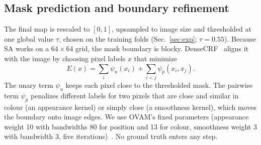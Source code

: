 \subsection{Mask prediction and boundary refinement}
\label{sec:method_crf}
The final map is rescaled to $[0,1]$, upsampled to image size and thresholded at one global value $\tau$, chosen on the training folds (Sec.~\ref{sec:exp}; $\tau{=}0.55$). Because SA works on a $64\times64$ grid, the mask boundary is blocky. DenseCRF~\cite{krahenbuhl2011crf} aligns it with the image by choosing pixel labels $x$ that minimize
\begin{equation}
E(x)=\sum_i\psi_u(x_i)+\sum_{i<j}\psi_p(x_i,x_j).
\label{eq:crf}
\end{equation}
The unary term $\psi_u$ keeps each pixel close to the thresholded mask. The pairwise term $\psi_p$ penalizes different labels for two pixels that are close and similar in colour (an appearance kernel) or simply close (a smoothness kernel), which moves the boundary onto image edges. We use OVAM's fixed parameters (appearance weight 10 with bandwidths 80 for position and 13 for colour, smoothness weight 3 with bandwidth 3, five iterations)~\cite{marcosmanchon2024ovam}. No ground truth enters any step.
